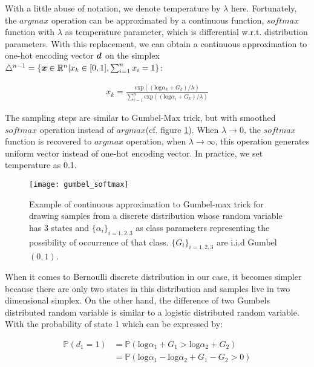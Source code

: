 With a little abuse of notation, we denote temperature by $\lambda$ here. Fortunately, the $argmax$ operation can be approximated by a continuous function, $softmax$ function with $\lambda$ as temperature parameter, which is differential w.r.t. distribution parameters. With this replacement, we can obtain a continuous approximation to one-hot encoding vector $\boldsymbol d$ on the simplex $\triangle^{n-1} = \{\boldsymbol x \in \mathbb R^n | x_k \in [0,1], \sum_{i=1}^{n} x_i = 1 \}$:

\begin{equation} \label{gumbel_softmax}
\begin{aligned}
x_{k} = \frac{\text{exp}((\text{log}\alpha_k + G_k)/\lambda)}{\sum_{i=1}^{n}\text{exp}((\text{log}\alpha_i + G_k)/\lambda)}
\end{aligned}
\end{equation}

The sampling steps are similar to Gumbel-Max trick, but with smoothed $softmax$ operation instead of $argmax$(cf. figure \ref{fig:gumbel_softmax}). When $\lambda \rightarrow 0$, the $softmax$ function is recovered to $argmax$ operation, when $\lambda \rightarrow \infty$, this operation generates uniform vector instead of one-hot encoding vector. In practice, we set temperature as 0.1.

\begin{figure}[h!]
	\begin{center}
		\texttt{[image: gumbel\_softmax]}
		\caption{Example of continuous approximation to Gumbel-max trick for drawing samples from a discrete distribution whose random variable has 3 states and $\{\alpha_{i}\}_{i=1,2,3}$ as class parameters representing the possibility of occurrence of that class. $\{G_{i}\}_{i=1,2,3}$ are i.i.d Gumbel$(0,1)$\cite{maddison2016concrete}.}		
		\label{fig:gumbel_softmax}
	\end{center}
\end{figure}

When it comes to Bernoulli discrete distribution in our case, it becomes simpler because there are only two states in this distribution and samples live in two dimensional simplex. On the other hand, the difference of two Gumbels distributed random variable is similar to a logistic distributed random variable.  With the probability of state 1 which can be expressed by:

\[
\begin{aligned}
\mathbb P(d_1 = 1) &= \mathbb P(\text{log} \alpha_1 + G_1 >\text{log} \alpha_2 + G_2)\\
&=\mathbb P(\text{log} \alpha_1 - \text{log} \alpha_2 + G_1 - G_2 > 0)
\end{aligned}
\] 

